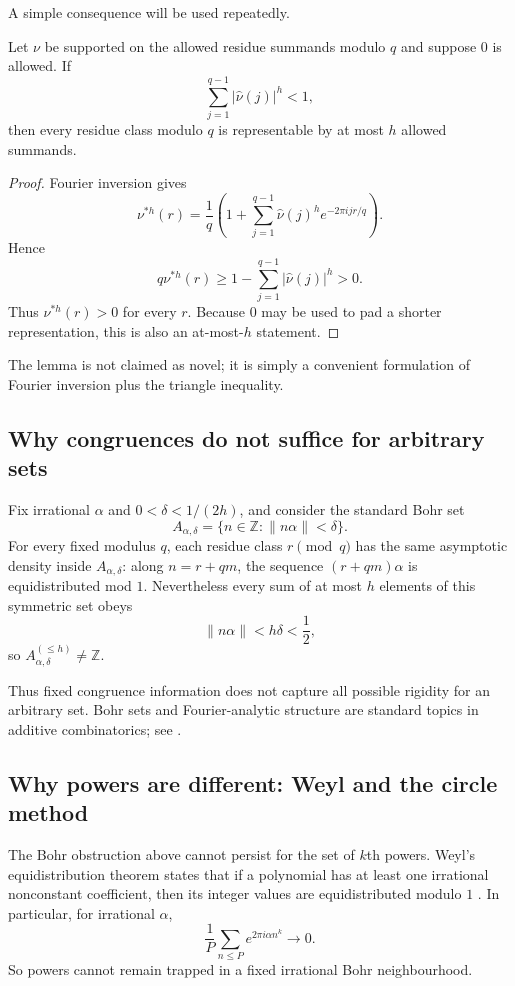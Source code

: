 \documentclass[../Axiomathic.tex]{subfiles}
\newcommand{\Z}{\mathbb Z}
\begin{document}
A simple consequence will be used repeatedly.

\begin{lemma}\label{lem:fourier-cover}
Let $\nu$ be supported on the allowed residue summands modulo $q$ and suppose $0$ is allowed.  If
\[
  \sum_{j=1}^{q-1}|\widehat\nu(j)|^h<1,
\]
then every residue class modulo $q$ is representable by at most $h$ allowed summands.
\end{lemma}

\begin{proof}
Fourier inversion gives
\[
  \nu^{*h}(r)=\frac1q\left(1+
    \sum_{j=1}^{q-1}\widehat\nu(j)^h e^{-2\pi ijr/q}\right).
\]
Hence
\[
  q\nu^{*h}(r)
  \ge 1-\sum_{j=1}^{q-1}|\widehat\nu(j)|^h>0.
\]
Thus $\nu^{*h}(r)>0$ for every $r$.  Because $0$ may be used to pad a shorter representation, this is also an at-most-$h$ statement.
\end{proof}

The lemma is not claimed as novel; it is simply a convenient formulation of Fourier inversion plus the triangle inequality.

\subsection{Why congruences do not suffice for arbitrary sets}

Fix irrational $\alpha$ and $0<\delta<1/(2h)$, and consider the standard Bohr set
\[
  A_{\alpha,\delta}=\{n\in\Z:\|n\alpha\|<\delta\}.
\]
For every fixed modulus $q$, each residue class $r\pmod q$ has the same asymptotic density inside $A_{\alpha,\delta}$: along $n=r+qm$, the sequence $(r+qm)\alpha$ is equidistributed mod $1$.  Nevertheless every sum of at most $h$ elements of this symmetric set obeys
\[
  \|n\alpha\|<h\delta<\frac12,
\]
so $A_{\alpha,\delta}^{(\le h)}\ne\Z$.

Thus fixed congruence information does not capture all possible rigidity for an arbitrary set.  Bohr sets and Fourier-analytic structure are standard topics in additive combinatorics; see \cite{TaoVu2006}.

\subsection{Why powers are different: Weyl and the circle method}

The Bohr obstruction above cannot persist for the set of $k$th powers.  Weyl's equidistribution theorem states that if a polynomial has at least one irrational nonconstant coefficient, then its integer values are equidistributed modulo $1$ \cite{Weyl1916}.  In particular, for irrational $\alpha$,
\begin{equation}\label{eq:weyl}
  \frac1P\sum_{n\le P}e^{2\pi i\alpha n^k}\longrightarrow0.
\end{equation}
So powers cannot remain trapped in a fixed irrational Bohr neighbourhood.
\end{document}
